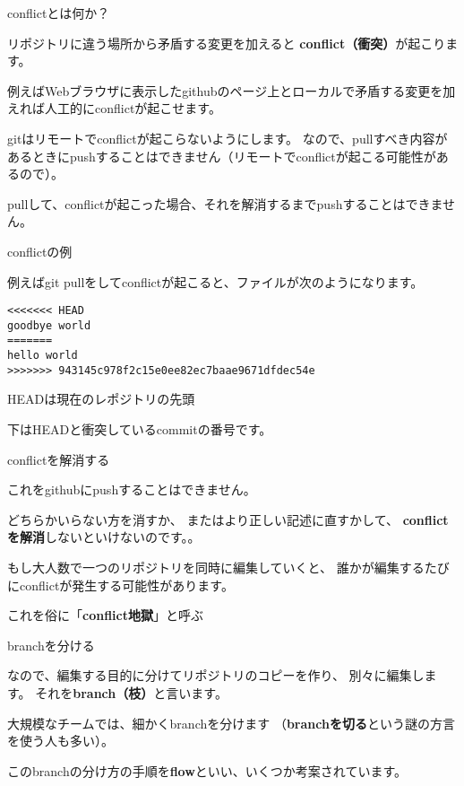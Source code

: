 \documentclass[12pt, unicode]{beamer}
\begin{document}
\begin{frame}{conflictとは何か？}

リポジトリに違う場所から矛盾する変更を加えると
\textbf{conflict（衝突）}が起こります。

例えばWebブラウザに表示したgithubのページ上とローカルで矛盾する変更を加えれば人工的にconflictが起こせます。

gitはリモートでconflictが起こらないようにします。
なので、pullすべき内容があるときにpushすることはできません（リモートでconflictが起こる可能性があるので）。

pullして、conflictが起こった場合、それを解消するまでpushすることはできません。

\end{frame}
\begin{frame}[fragile]{conflictの例}

例えばgit pullをしてconflictが起こると、ファイルが次のようになります。

\begin{verbatim}
<<<<<<< HEAD
goodbye world
=======
hello world
>>>>>>> 943145c978f2c15e0ee82ec7baae9671dfdec54e
\end{verbatim}

HEADは現在のレポジトリの先頭

下はHEADと衝突しているcommitの番号です。

\end{frame}
\begin{frame}{conflictを解消する}

これをgithubにpushすることはできません。

どちらかいらない方を消すか、
またはより正しい記述に直すかして、
\textbf{conflictを解消}しないといけないのです。。

もし大人数で一つのリポジトリを同時に編集していくと、
誰かが編集するたびにconflictが発生する可能性があります。

これを俗に「\textbf{conflict地獄}」と呼ぶ

\end{frame}
\begin{frame}{branchを分ける}

なので、編集する目的に分けてリポジトリのコピーを作り、
別々に編集します。
それを\textbf{branch（枝）}と言います。

大規模なチームでは、細かくbranchを分けます
（\textbf{branchを切る}という謎の方言を使う人も多い）。

このbranchの分け方の手順を\textbf{flow}といい、いくつか考案されています。

\end{frame}
\end{document}
